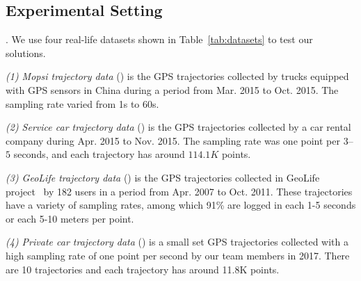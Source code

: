\subsection{Experimental Setting}

.
We use four real-life datasets shown in Table~\ref{tab:datasets} to test our solutions.

\vspace{0.5ex}
\ni \emph{(1) Mopsi trajectory data} (\mopsi) is the GPS trajectories collected by  trucks equipped with GPS sensors in China
during a period from Mar. 2015 to Oct. 2015. The sampling rate varied from 1s to 60s.



\vspace{0.5ex}
\ni \emph{(2) Service car trajectory data} (\sercar) is the GPS trajectories collected by a car rental company during Apr. 2015 to Nov. 2015. The sampling rate was one point per $3$--$5$ seconds, and
each trajectory has around $114.1K$ points.

\vspace{0.5ex}
\ni \emph{(3) GeoLife trajectory data} (\geolife) is the GPS trajectories collected in GeoLife project~\cite{Zheng:GeoLife} by 182 users in a period from Apr. 2007 to Oct. 2011. These trajectories have a variety of sampling rates, among which 91\% are logged in each 1-5 seconds or each 5-10 meters per point.

\vspace{0.5ex}
\ni \emph{(4) Private car trajectory data} (\pricar) is a small set GPS trajectories  collected with a high sampling rate of one point per second by our team members in 2017. There are 10 trajectories and each trajectory has around 11.8K points.






